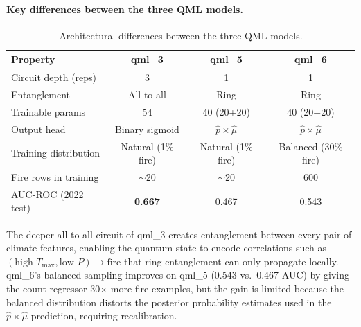 \documentclass[11pt,a4paper]{article}
\begin{document}
\paragraph{Key differences between the three QML models.}

\begin{table}[H]
\centering
\caption{Architectural differences between the three QML models.}
\begin{tabular}{lccc}
\toprule
\textbf{Property} & \textbf{qml\_3} & \textbf{qml\_5} & \textbf{qml\_6} \\
\midrule
Circuit depth (reps) & 3 & 1 & 1 \\
Entanglement & All-to-all & Ring & Ring \\
Trainable params & 54 & 40 (20+20) & 40 (20+20) \\
Output head & Binary sigmoid & $\hat{p} \times \hat{\mu}$ & $\hat{p} \times \hat{\mu}$ \\
Training distribution & Natural (1\% fire) & Natural (1\% fire) & Balanced (30\% fire) \\
Fire rows in training & $\sim$20 & $\sim$20 & 600 \\
AUC-ROC (2022 test) & \textbf{0.667} & 0.467 & 0.543 \\
\bottomrule
\end{tabular}
\label{tab:arch_diff}
\end{table}

The deeper all-to-all circuit of qml\_3 creates entanglement between every pair
of climate features, enabling the quantum state to encode correlations such as
$(\text{high }T_{\max}, \text{low }P) \to \text{fire}$ that ring entanglement
can only propagate locally. qml\_6's balanced sampling improves on qml\_5
(0.543 vs.\ 0.467 AUC) by giving the count regressor 30$\times$ more fire
examples, but the gain is limited because the balanced distribution distorts
the posterior probability estimates used in the $\hat{p} \times \hat{\mu}$
prediction, requiring recalibration.
\end{document}
